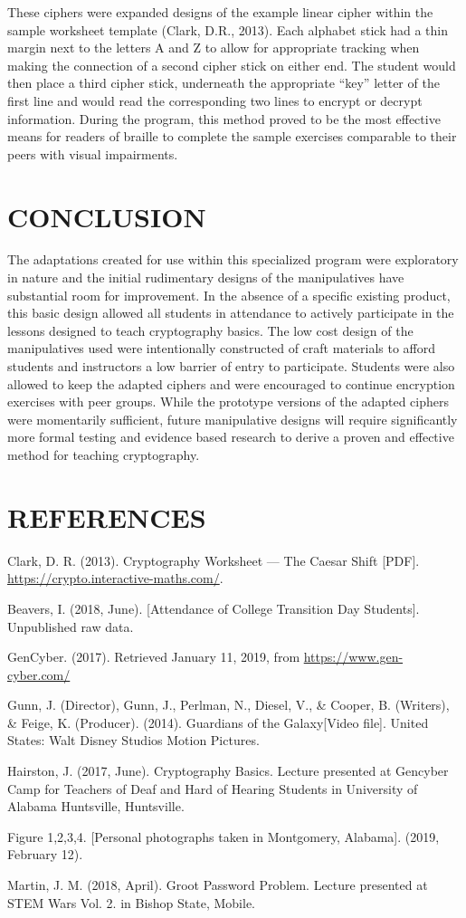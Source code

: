 \documentclass[11.5pt]{sig-alternate} %
\begin{document}
\begin{large}
These ciphers were expanded designs of the example linear cipher within the sample worksheet template (Clark, D.R., 2013). Each alphabet stick had a thin margin next to the letters A and Z to allow for appropriate tracking when making the connection of a second cipher stick on either end. The student would then place a third cipher stick, underneath the appropriate “key” letter of the first line and would read the corresponding two lines to encrypt or decrypt information. During the program, this method proved to be the most effective means for readers of braille to complete the sample exercises comparable to their peers with visual impairments.

\section*{CONCLUSION}

The adaptations created for use within this specialized program were exploratory in nature and the initial rudimentary designs of the manipulatives have substantial room for improvement. In the absence of a specific existing product, this basic design allowed all students in attendance to actively participate in the lessons designed to teach  cryptography basics. The low cost design of the manipulatives used were intentionally constructed of craft materials to afford students and instructors a low barrier of entry to participate. Students were also allowed to keep the adapted ciphers and were encouraged to continue encryption exercises with peer groups. While the prototype versions of the adapted ciphers were momentarily sufficient, future manipulative designs will require significantly more formal testing and evidence based research to derive a proven and effective method for teaching cryptography.  

\end{large}
\clearpage
\section*{REFERENCES}\par 

\leftskip 0.25in
\parindent -0.25in 
Clark, D. R. (2013). Cryptography Worksheet — The Caesar Shift [PDF]. \url{https://crypto.interactive-maths.com/}.

Beavers, I. (2018, June). [Attendance of College Transition Day Students]. Unpublished raw data.

GenCyber. (2017). Retrieved January 11, 2019, from \url{https://www.gen-cyber.com/}

Gunn, J. (Director), Gunn, J., Perlman, N., Diesel, V., \& Cooper, B. (Writers), \& Feige, K. (Producer). (2014). Guardians of the Galaxy[Video file]. United States: Walt Disney Studios Motion Pictures.

Hairston, J. (2017, June). Cryptography Basics. Lecture presented at Gencyber Camp for Teachers of Deaf and Hard of Hearing Students in University of Alabama Huntsville, Huntsville.

Figure 1,2,3,4. [Personal photographs taken in Montgomery, Alabama]. (2019, February 12).

Martin, J. M. (2018, April). Groot Password Problem. Lecture presented at STEM Wars Vol. 2. in Bishop State, Mobile.
\end{document}
